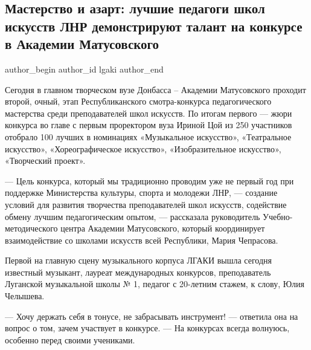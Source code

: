  
 
 
 
 
\subsection{Мастерство и азарт: лучшие педагоги школ искусств ЛНР демонстрируют талант на конкурсе в Академии Матусовского}
\label{sec:15_01_2022.stz.edu.lnr.lgaki.1.masterstvo_i_azart}

\ifcmt
 author_begin
   author_id lgaki
 author_end
\fi

Сегодня в главном творческом вузе Донбасса – Академии Матусовского проходит
второй, очный, этап Республиканского смотра-конкурса педагогического мастерства
среди преподавателей школ искусств. По итогам первого — жюри конкурса во главе
с первым проректором вуза Ириной Цой из 250 участников отобрало 100 лучших в
номинациях «Музыкальное искусство», «Театральное искусство», «Хореографическое
искусство», «Изобразительное искусство», «Творческий проект».

— Цель конкурса, который мы традиционно проводим уже не первый год при
поддержке Министерства культуры, спорта и молодежи ЛНР, — создание условий для
развития творчества преподавателей школ искусств, содействие обмену лучшим
педагогическим опытом, — рассказала руководитель Учебно-методического центра
Академии Матусовского, который координирует взаимодействие со школами искусств
всей Республики, Мария Чепрасова.

Первой на главную сцену музыкального корпуса ЛГАКИ вышла сегодня известный
музыкант, лауреат международных конкурсов, преподаватель Луганской музыкальной
школы № 1, педагог с 20-летним стажем, к слову, Юлия Челышева.

— Хочу держать себя в тонусе, не забрасывать инструмент! — ответила она на
вопрос о том, зачем участвует в конкурсе. — На конкурсах всегда волнуюсь,
особенно перед своими учениками.

